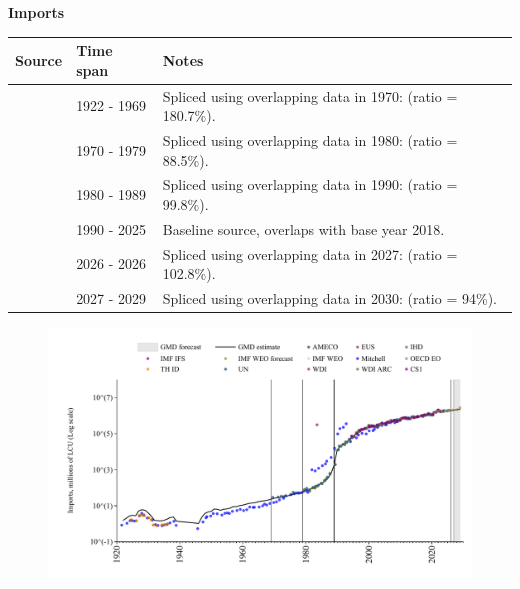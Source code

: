 \documentclass[12pt,a4paper,landscape]{article}
\begin{document}
\begin{adjustbox}{max totalsize={\paperwidth}{\paperheight},center}
\begin{minipage}[t][\textheight][t]{\textwidth}
\vspace*{0.5cm}
{}
\begin{center}
{\Large\bfseries Imports}
\end{center}
\vspace{0.5cm}
\begin{table}[H]
\centering
\small
\begin{tabular}{|l|l|l|}
\hline
\textbf{Source} & \textbf{Time span} & \textbf{Notes} \\
\hline
\rowcolor{white}\cite{Mitchell}& 1922 - 1969 &Spliced using overlapping data in 1970: (ratio = 180.7\%). \\
\rowcolor{lightgray}\cite{UN}& 1970 - 1979 &Spliced using overlapping data in 1980: (ratio = 88.5\%). \\
\rowcolor{white}\cite{AMECO}& 1980 - 1989 &Spliced using overlapping data in 1990: (ratio = 99.8\%). \\
\rowcolor{lightgray}\cite{OECD_EO}& 1990 - 2025 &Baseline source, overlaps with base year 2018. \\
\rowcolor{white}\cite{AMECO}& 2026 - 2026 &Spliced using overlapping data in 2027: (ratio = 102.8\%). \\
\rowcolor{lightgray}\cite{IMF_WEO_forecast}& 2027 - 2029 &Spliced using overlapping data in 2030: (ratio = 94\%). \\
\hline
\end{tabular}
\end{table}
\begin{figure}[H]
\centering
\includegraphics[width=\textwidth,height=0.6\textheight,keepaspectratio]{graphs/POL_imports.pdf}
\end{figure}
\end{minipage}
\end{adjustbox}
\end{document}

